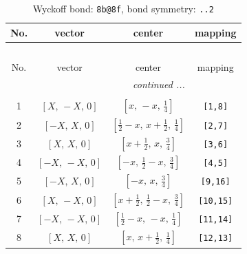 \documentclass[fleqn,8pt]{jsarticle}
\begin{document}
\begin{longtable}{cccc}
\caption{Wyckoff bond: {\tt 8b@8f}, bond symmetry: {\tt ..2}}
 \\
 \hline \hline
No. & vector & center & mapping \\ \hline \endfirsthead

\multicolumn{3}{l}{\tablename\ \thetable{}} \\
 \hline \hline
No. & vector & center & mapping \\ \hline \endhead

 \hline \hline
\multicolumn{3}{r}{\footnotesize\it continued ...} \\ \endfoot

 \hline \hline
\multicolumn{3}{r}{} \\ \endlastfoot

1 & $\left[ X,\, - X,\, 0 \right]$ & $\left[ x,\, - x,\, \frac{1}{4} \right]$ & {\tt [1,8]} \\ \hline
2 & $\left[ - X,\, X,\, 0 \right]$ & $\left[ \frac{1}{2} - x,\, x + \frac{1}{2},\, \frac{1}{4} \right]$ & {\tt [2,7]} \\ \hline
3 & $\left[ X,\, X,\, 0 \right]$ & $\left[ x + \frac{1}{2},\, x,\, \frac{3}{4} \right]$ & {\tt [3,6]} \\ \hline
4 & $\left[ - X,\, - X,\, 0 \right]$ & $\left[ - x,\, \frac{1}{2} - x,\, \frac{3}{4} \right]$ & {\tt [4,5]} \\ \hline
5 & $\left[ - X,\, X,\, 0 \right]$ & $\left[ - x,\, x,\, \frac{3}{4} \right]$ & {\tt [9,16]} \\ \hline
6 & $\left[ X,\, - X,\, 0 \right]$ & $\left[ x + \frac{1}{2},\, \frac{1}{2} - x,\, \frac{3}{4} \right]$ & {\tt [10,15]} \\ \hline
7 & $\left[ - X,\, - X,\, 0 \right]$ & $\left[ \frac{1}{2} - x,\, - x,\, \frac{1}{4} \right]$ & {\tt [11,14]} \\ \hline
8 & $\left[ X,\, X,\, 0 \right]$ & $\left[ x,\, x + \frac{1}{2},\, \frac{1}{4} \right]$ & {\tt [12,13]} \\
\end{longtable}
\renewcommand{\arraystretch}{1.2}
\end{document}
